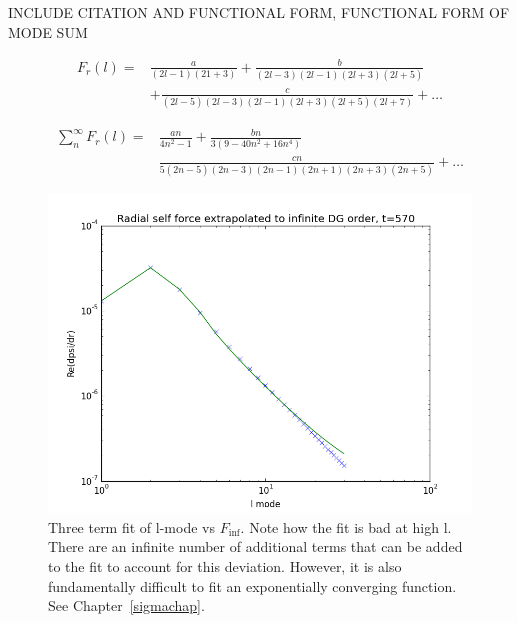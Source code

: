 INCLUDE CITATION AND FUNCTIONAL FORM, FUNCTIONAL FORM OF MODE SUM









\begin{eqnarray}
  F_r(l)=&\frac{a}{(2l-1)(21+3)}+\frac{b}{(2l-3)(2l-1)(2l+3)(2l+5)}\nonumber \\
  &+\frac{c}{(2l-5)(2l-3)(2l-1)(2l+3)(2l+5)(2l+7)}+\ldots
\end{eqnarray}

  
\begin{eqnarray}
  \sum_n^{\infty} F_r(l) = &\frac{an}{4n^2-1}+\frac{bn}{3(9-40n^2+16n^4)}\nonumber\\
  &\frac{cn}{5(2n-5)(2n-3)(2n-1)(2n+1)(2n+3)(2n+5)}+\ldots
\end{eqnarray}

\begin{figure}
  \includegraphics{finffit570}
  \caption{Three term fit of l-mode vs $F_{\inf}$. Note how the fit is bad at high l. There are an infinite number of additional terms that can be added to the fit to account for this deviation. However, it is also fundamentally difficult to fit an exponentially converging function. See Chapter~\ref{sigmachap}.}
\end{figure}


